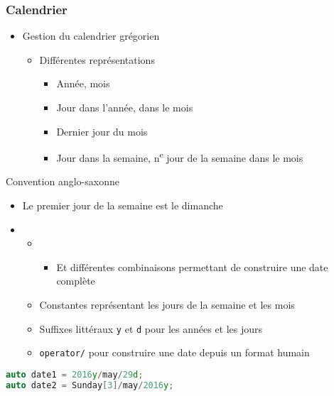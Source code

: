 \documentclass[C++.tex]{subfiles}
\begin{document}
\begin{frame}[fragile]
	\frametitle{Calendrier}
	\begin{itemize}
		\item Gestion du calendrier grégorien
		\begin{itemize}
			\item Différentes représentations
			\begin{itemize}
				\item Année, mois
				\item Jour dans l'année, dans le mois
				\item Dernier jour du mois
				\item Jour dans la semaine, n\textsuperscript{e} jour de la semaine dans le mois
			\end{itemize}
		\end{itemize}
	\end{itemize}

	\begin{alertblock}{Convention anglo-saxonne}
		\begin{itemize}
			\item Le premier jour de la semaine est le dimanche
		\end{itemize}
	\end{alertblock}

	\begin{itemize}
		\item [] \begin{itemize}
			\item [] \begin{itemize}
				\item Et différentes combinaisons permettant de construire une date complète
			\end{itemize}
			\item Constantes représentant les jours de la semaine et les mois
			\item Suffixes littéraux \lstinline|y| et \lstinline|d| pour les années et les jours
			\item \lstinline|operator/| pour construire une date depuis un format \og humain\fg{}
		\end{itemize}
	\end{itemize}

	\begin{lstlisting}[language=C++]
auto date1 = 2016y/may/29d;
auto date2 = Sunday[3]/may/2016y;\end{lstlisting}
\end{frame}
\end{document}
